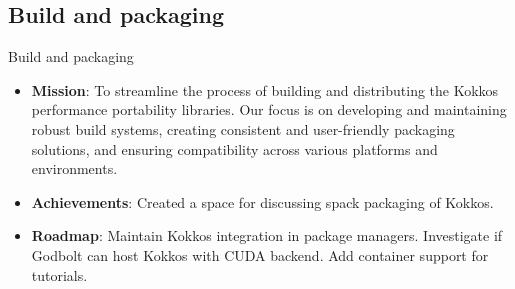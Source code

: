 \subsection{Build and packaging}
\begin{frame}[fragile]{Build and packaging}
    \begin{center}
        \begin{itemize}
            \item \textbf{Mission}: To streamline the process of building and distributing the Kokkos performance portability libraries. Our focus is on developing and maintaining robust build systems, creating consistent and user-friendly packaging solutions, and ensuring compatibility across various platforms and environments.
            \item \textbf{Achievements}: Created a space for discussing spack packaging of Kokkos.
            \item \textbf{Roadmap}: Maintain Kokkos integration in package managers. Investigate if Godbolt can host Kokkos with CUDA backend. Add container support for tutorials.
        \end{itemize}
    \end{center}
\end{frame}